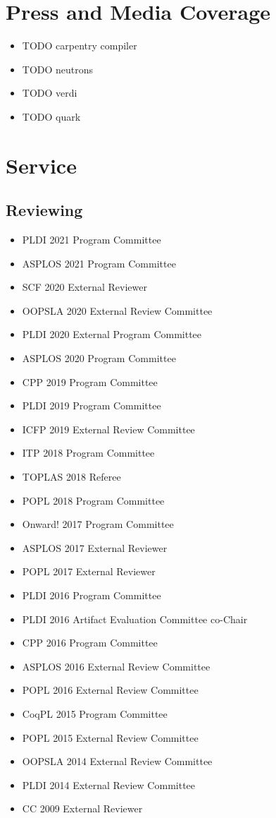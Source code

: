 \documentclass[10pt]{article}
\begin{document}
\section*{Press and Media Coverage}

\begin{itemize}
  \item TODO carpentry compiler
  \item TODO neutrons
  \item TODO verdi
  \item TODO quark
\end{itemize}


\section*{Service}

\subsection*{Reviewing}

\begin{itemize}
  \item PLDI 2021 Program Committee
  \item ASPLOS 2021 Program Committee
  \item SCF 2020 External Reviewer
  \item OOPSLA 2020 External Review Committee
  \item PLDI 2020 External Program Committee
  \item ASPLOS 2020 Program Committee
  \item CPP 2019 Program Committee
  \item PLDI 2019 Program Committee
  \item ICFP 2019 External Review Committee
  \item ITP 2018 Program Committee
  \item TOPLAS 2018 Referee
  \item POPL 2018 Program Committee
  \item Onward! 2017 Program Committee
  \item ASPLOS 2017 External Reviewer
  \item POPL 2017 External Reviewer
  \item PLDI 2016 Program Committee
  \item PLDI 2016 Artifact Evaluation Committee co-Chair
  \item CPP 2016 Program Committee
  \item ASPLOS 2016 External Review Committee
  \item POPL 2016 External Review Committee
  \item CoqPL 2015 Program Committee
  \item POPL 2015 External Review Committee
  \item OOPSLA 2014 External Review Committee
  \item PLDI 2014 External Review Committee
  \item CC 2009 External Reviewer
\end{itemize}
\end{document}

